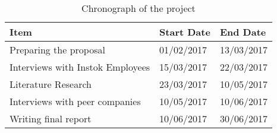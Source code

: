 \documentclass[man]{apa6}
\begin{document}
\begin{table}[]
\centering
\caption{Chronograph of the project}
\label{chronograph}
\begin{tabular}{|l|l|l|}
\hline
Item                             & Start Date & End Date   \\ \hline
Preparing the proposal			 & 01/02/2017 & 13/03/2017 \\ \hline
Interviews with Instok Employees & 15/03/2017 & 22/03/2017 \\ \hline
Literature Research              & 23/03/2017 & 10/05/2017 \\ \hline
Interviews with  peer companies  & 10/05/2017 & 10/06/2017 \\ \hline
Writing final report             & 10/06/2017 & 30/06/2017 \\ \hline
\end{tabular}
\end{table}

\printbibliography

\end{document}

